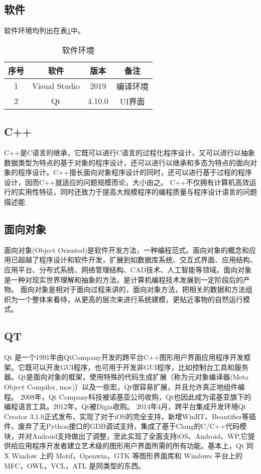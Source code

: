 \documentclass[forprint]{shmtu}
\begin{document}
\subsection{软件}

软件环境均列出在表\ref{tab:1}中。

\begin{table}[!htbp]
	\centering
	\caption{软件环境}
	\begin{tabular}{cccc}
		\hline
		序号 & 软件            & 版本     & 备注   \\ \hline
		1  & Visual Studio & 2019   & 编译环境 \\
		2  & Qt            & 4.10.0 & UI界面 \\ \hline
	\end{tabular}
	\label{tab:1}
\end{table}

\subsection{C++}
C++是C语言的继承，它既可以进行C语言的过程化程序设计，又可以进行以抽象数据类型为特点的基于对象的程序设计，还可以进行以继承和多态为特点的面向对象的程序设计。C++擅长面向对象程序设计的同时，还可以进行基于过程的程序设计，因而C++就适应的问题规模而论，大小由之。
C++不仅拥有计算机高效运行的实用性特征，同时还致力于提高大规模程序的编程质量与程序设计语言的问题描述能

\subsection{面向对象}
面向对象(Object Oriented)是软件开发方法，一种编程范式。面向对象的概念和应用已超越了程序设计和软件开发，扩展到如数据库系统、交互式界面、应用结构、应用平台、分布式系统、网络管理结构、CAD技术、人工智能等领域。面向对象是一种对现实世界理解和抽象的方法，是计算机编程技术发展到一定阶段后的产物。
面向对象是相对于面向过程来讲的，面向对象方法，把相关的数据和方法组织为一个整体来看待，从更高的层次来进行系统建模，更贴近事物的自然运行模式。

\subsection{QT}
Qt 是一个1991年由QtCompany开发的跨平台C++图形用户界面应用程序开发框架。它既可以开发GUI程序，也可用于开发非GUI程序，比如控制台工具和服务器。Qt是面向对象的框架，使用特殊的代码生成扩展（称为元对象编译器(Meta Object Compiler, moc)）以及一些宏，Qt很容易扩展，并且允许真正地组件编程。
2008年，Qt Company科技被诺基亚公司收购，Qt也因此成为诺基亚旗下的编程语言工具。2012年，Qt被Digia收购。
2014年4月，跨平台集成开发环境Qt Creator 3.1.0正式发布，实现了对于iOS的完全支持，新增WinRT、Beautifier等插件，废弃了无Python接口的GDB调试支持，集成了基于Clang的C/C++代码模块，并对Android支持做出了调整，至此实现了全面支持iOS、Android、WP,它提供给应用程序开发者建立艺术级的图形用户界面所需的所有功能。基本上，Qt 同 X Window 上的 Motif，Openwin，GTK 等图形界面库和 Windows 平台上的 MFC，OWL，VCL，ATL 是同类型的东西。
\end{document}
